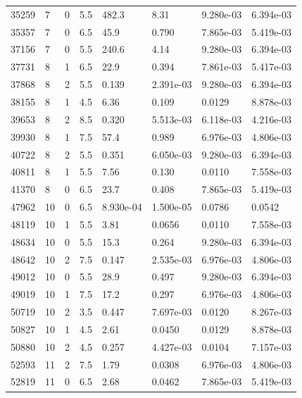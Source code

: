 \documentclass[preview]{standalone}
\begin{document}
{{{\begin{tabular}{L{1.2cm}C{1.2cm} C{0.3cm}C{0.5cm} C{1.4cm}C{1.4cm} C{1.4cm}C{1.4cm}}
  35259  &     7  & 0     & 5.5 &  482.3  & 8.31  & 9.280e-03 &  6.394e-03   \\ 
  35357  &     7  & 0     & 6.5 &  45.9  & 0.790  & 7.865e-03 &  5.419e-03   \\ 
  37156  &     7  & 0     & 5.5 &  240.6  & 4.14  & 9.280e-03 &  6.394e-03   \\ 
  37731  &     8  & 1     & 6.5 &  22.9  & 0.394  & 7.861e-03 &  5.417e-03   \\ 
  37868  &     8  & 2     & 5.5 &  0.139  & 2.391e-03  & 9.280e-03 &  6.394e-03   \\ 
  38155  &     8  & 1     & 4.5 &  6.36  & 0.109  & 0.0129 &  8.878e-03   \\ 
  39653  &     8  & 2     & 8.5 &  0.320  & 5.513e-03  & 6.118e-03 &  4.216e-03   \\ 
  39930  &     8  & 1     & 7.5 &  57.4  & 0.989  & 6.976e-03 &  4.806e-03   \\ 
  40722  &     8  & 2     & 5.5 &  0.351  & 6.050e-03  & 9.280e-03 &  6.394e-03   \\ 
  40811  &     8  & 1     & 5.5 &  7.56  & 0.130  & 0.0110 &  7.558e-03   \\ 
  41370  &     8  & 0     & 6.5 &  23.7  & 0.408  & 7.865e-03 &  5.419e-03   \\ 
  47962  &    10  & 0     & 6.5 &  8.930e-04  & 1.500e-05  & 0.0786 &  0.0542   \\ 
  48119  &    10  & 1     & 5.5 &  3.81  & 0.0656  & 0.0110 &  7.558e-03   \\ 
  48634  &    10  & 0     & 5.5 &  15.3  & 0.264  & 9.280e-03 &  6.394e-03   \\ 
  48642  &    10  & 2     & 7.5 &  0.147  & 2.535e-03  & 6.976e-03 &  4.806e-03   \\ 
  49012  &    10  & 0     & 5.5 &  28.9  & 0.497  & 9.280e-03 &  6.394e-03   \\ 
  49019  &    10  & 1     & 7.5 &  17.2  & 0.297  & 6.976e-03 &  4.806e-03   \\ 
  50719  &    10  & 2     & 3.5 &  0.447  & 7.697e-03  & 0.0120 &  8.267e-03   \\ 
  50827  &    10  & 1     & 4.5 &  2.61  & 0.0450  & 0.0129 &  8.878e-03   \\ 
  50880  &    10  & 2     & 4.5 &  0.257  & 4.427e-03  & 0.0104 &  7.157e-03   \\ 
  52593  &    11  & 2     & 7.5 &  1.79  & 0.0308  & 6.976e-03 &  4.806e-03   \\ 
  52819  &    11  & 0     & 6.5 &  2.68  & 0.0462  & 7.865e-03 &  5.419e-03   \\ 

\end{tabular}}}}
\end{document}
